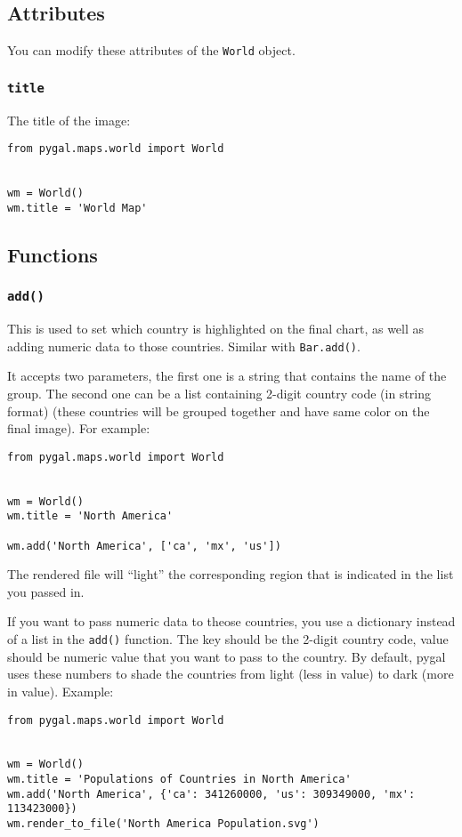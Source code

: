 \documentclass[12pt]{book}
\begin{document}
\subsection{Attributes}
\label{sec:org2b74f10}
You can modify these attributes of the \texttt{World} object.
\subsubsection{\texttt{title}}
\label{sec:orga4ad247}
The title of the image:
\begin{verbatim}
from pygal.maps.world import World


wm = World()
wm.title = 'World Map'
\end{verbatim}

\subsection{Functions}
\label{sec:org22bf1cf}
\subsubsection{\texttt{add()}}
\label{sec:orge5f1105}
This is used to set which country is highlighted on the final chart, as well as adding numeric data to those countries. Similar with \texttt{Bar.add()}.

It accepts two parameters, the first one is a string that contains the name of the group. The second one can be a list containing 2-digit country code (in string format) (these countries will be grouped together and have same color on the final image). For example:
\begin{verbatim}
from pygal.maps.world import World


wm = World()
wm.title = 'North America'

wm.add('North America', ['ca', 'mx', 'us'])
\end{verbatim}
The rendered file will ``light'' the corresponding region that is indicated in the list you passed in.

If you want to pass numeric data to theose countries, you use a dictionary instead of a list in the \texttt{add()} function. The key should be the 2-digit country code, value should be numeric value that you want to pass to the country. By default, pygal uses these numbers to shade the countries from light (less in value) to dark (more in value). Example:
\begin{verbatim}
from pygal.maps.world import World


wm = World()
wm.title = 'Populations of Countries in North America'
wm.add('North America', {'ca': 341260000, 'us': 309349000, 'mx': 113423000})
wm.render_to_file('North America Population.svg')
\end{verbatim}
\end{document}
